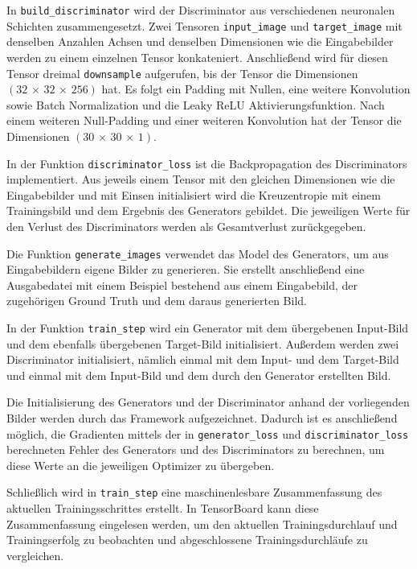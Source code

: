 In \lstinline|build_discriminator| wird der Discriminator aus verschiedenen neuronalen Schichten zusammengesetzt. Zwei Tensoren \lstinline|input_image| und \lstinline|target_image| mit denselben Anzahlen Achsen und denselben Dimensionen wie die Eingabebilder werden zu einem einzelnen Tensor konkateniert. Anschließend wird für diesen Tensor dreimal \lstinline|downsample| aufgerufen, bis der Tensor die Dimensionen $(32\,\times\,32\,\times\,256)$ hat. Es folgt ein Padding mit Nullen, eine weitere Konvolution sowie Batch Normalization und die Leaky ReLU Aktivierungsfunktion. Nach einem weiteren Null-Padding und einer weiteren Konvolution hat der Tensor die Dimensionen $(30\,\times\,30\,\times\,1)$.

In der Funktion \lstinline|discriminator_loss| ist die Backpropagation des Discriminators implementiert. Aus jeweils einem Tensor mit den gleichen Dimensionen wie die Eingabebilder und mit Einsen initialisiert wird die Kreuzentropie mit einem Trainingsbild und dem Ergebnis des Generators gebildet. Die jeweiligen Werte für den Verlust des Discriminators werden als Gesamtverlust zurückgegeben.

Die Funktion \lstinline|generate_images| verwendet das Model des Generators, um aus Eingabebildern eigene Bilder zu generieren. Sie erstellt anschließend eine Ausgabedatei mit einem Beispiel bestehend aus einem Eingabebild, der zugehörigen Ground Truth und dem daraus generierten Bild.

In der Funktion \lstinline|train_step| wird ein Generator mit dem übergebenen Input-Bild und dem ebenfalls übergebenen Target-Bild initialisiert. Außerdem werden zwei Discriminator initialisiert, nämlich einmal mit dem Input- und dem Target-Bild und einmal mit dem Input-Bild und dem durch den Generator erstellten Bild.

Die Initialisierung des Generators und der Discriminator anhand der vorliegenden Bilder werden durch das Framework aufgezeichnet. Dadurch ist es anschließend möglich, die Gradienten mittels der in \lstinline|generator_loss| und \lstinline|discriminator_loss| berechneten Fehler des Generators und des Discriminators zu berechnen, um diese Werte an die jeweiligen Optimizer zu übergeben.

Schließlich wird in \lstinline|train_step| eine maschinenlesbare Zusammenfassung des aktuellen Trainingsschrittes erstellt. In TensorBoard kann diese Zusammenfassung eingelesen werden, um den aktuellen Trainingsdurchlauf und Trainingserfolg zu beobachten und abgeschlossene Trainingsdurchläufe zu vergleichen.


